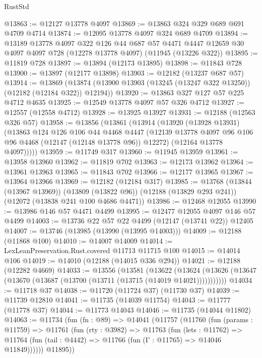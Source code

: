 \begin{lexlean}{RustStd}
\begin{coremodule}
{\begin{coremodule}
{{{{{{{{{{{{{{{{{{{{{{{{{{{{{{{{{{{{{{{{{{{{{{{{{{{{{{{{{{{{{{{{{{{{@13863 := @12127 @13778 @4097
@13869 := @13863 @324 @329 @689 @691 @4709 @4714
@13874 := @12095 @13778 @4097 @324 @689 @4709
@13894 := @13189
    @13778
    @4097
    @322
    @126
    @44
    @687
    @57
    @4471
    @4447
    @12659
    @30
    @4097
    @4097
    @728
    (@12278 @13778 @4097)
    (@11945 (@13226 @322))
@13895 := @11819 @728
@13897 := @13894 (@12173 @13895)
@13898 := @11843 @728
@13900 := @13897 (@12177 @13898)
@13903 := @12182 (@13237 @687 @57)
@13914 := @13869
    (@13874 (@13900 @13903 (@13245 (@13247 @322 @13250)) (@12182 (@12184 @322)) @12194))
@13920 := @13863 @327 @127 @57 @225 @4712 @4635
@13925 := @12549 @13778 @4097 @57 @326 @4712
@13927 := @12557 (@12558 @4712)
@13928 := @13925 @13927
@13931 := @12188 (@12563 @326 @57)
@13958 := @13856
    (@13861
      (@13914
        (@13920
          (@13928 @13931)
          (@13863
            @124
            @126
            @106
            @44
            @4468
            @4447
            (@12139 @13778 @4097 @96 @106 @96 @4468 (@12147 (@12148 @13778 @96)) @12272)
            (@12164 @13778 @4097)))))
@13959 := @11749 @317
@13960 := @11945 @13959
@13961 := @13958 @13960
@13962 := @11819 @702
@13963 := @12173 @13962
@13964 := @13961 @13963
@13965 := @11843 @702
@13966 := @12177 @13965
@13967 := @13964 @13966
@13969 := @12182 (@12184 @317)
@13985 := @13768
    (@13844 (@13967 @13969))
    (@13809 (@13822 @96))
    (@12188 (@13829 @293 @241))
    (@12072 (@13838 @241 @100 @4686 @4471))
@13986 := @12468 @12055
@13990 := @13986 @146 @57 @4471 @4499
@13995 := @12477 @12055 @4097 @146 @57 @4499
@14003 := @13736 @22 @57 @22 @4499 (@12147 (@13741 @22)) @12405
@14007 := @13746 (@13985 (@13990 (@13995 @14003)))
@14009 := @12188 (@11868 @100)
@14010 := @14007 @14009
@14014 := LexLeanPreservation.Rust.covered @11713 @11715 @100
@14015 := @14014 @106
@14019 := @14010 (@12188 (@14015 @336 @294))
@14021 := @12188 (@12282 @4669)
@14033 := @13556
    (@13581
      (@13622
        (@13624 (@13626 (@13647 (@13670 (@13687 (@13700 (@13711 (@13715 (@14019 @14021)))))))))))
@14034 := @11718 @37
@14038 := @11720 (@11724 @37) (@11730 @37)
@14039 := @11739 @12810
@14041 := @11735 (@14039 @11754)
@14043 := @11777 (@11778 @37)
@14044 := @11773 @14043
@14046 := @11735 (@14044 @11802)
@14063 := @11734
    (fun (fn : @89) =>
    @14041
      (@11757
        (@11760
          (fun (params : @11759) =>
          @11761
            (fun (rty : @3982) =>
            @11763
              (fun (lets : @11762) =>
              @11764 (fun (tail : @4442) => @11766 (fun (Γ : @11765) => @14046 @11849))))))
        @11895))
}}}}}}}}}}}}}}}}}}}}}}}}}}}}}}}}}}}}}}}}}}}}}}}}}}}}}}}}}}}}}}}}}}}}
\end{coremodule}}
\end{coremodule}
\end{lexlean}
